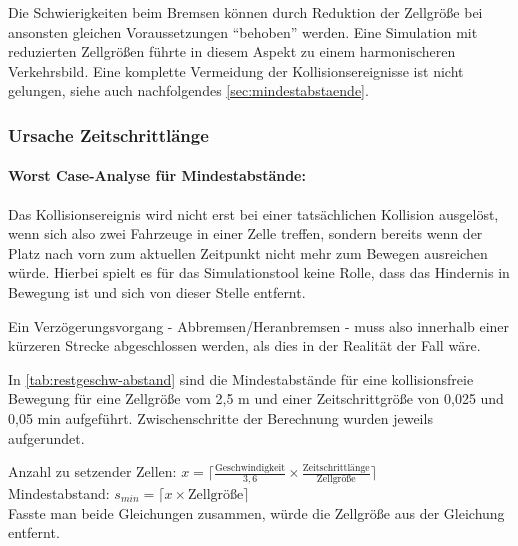 Die Schwierigkeiten beim Bremsen können durch Reduktion der Zellgröße bei ansonsten gleichen Voraussetzungen \enquote{behoben} werden.
Eine Simulation mit reduzierten Zellgrößen führte in diesem Aspekt zu einem harmonischeren Verkehrsbild.
Eine komplette Vermeidung der Kollisionsereignisse ist nicht gelungen, siehe auch nachfolgendes \cref{sec:mindestabstaende}.



\subsubsection{Ursache Zeitschrittlänge}

\paragraph*{Worst Case-Analyse für Mindestabstände:}
\label{sec:mindestabstaende}

Das Kollisionsereignis wird nicht erst bei einer tatsächlichen Kollision ausgelöst, wenn sich also zwei Fahrzeuge in einer Zelle treffen, sondern bereits wenn der Platz nach vorn zum aktuellen Zeitpunkt nicht mehr zum Bewegen ausreichen würde.
Hierbei spielt es für das Simulationstool keine Rolle, dass das Hindernis in Bewegung ist und sich von dieser Stelle entfernt.

Ein Verzögerungsvorgang - Abbremsen/Heranbremsen - muss also innerhalb einer kürzeren Strecke abgeschlossen werden, als dies in der Realität der Fall wäre.

In \cref{tab:restgeschw-abstand} sind die Mindestabstände für eine kollisionsfreie Bewegung für eine Zellgröße vom 2,5 m und einer Zeitschrittgröße von 0,025 und 0,05 min aufgeführt.
Zwischenschritte der Berechnung wurden jeweils aufgerundet.

\noindent
Anzahl zu setzender Zellen: $ x = \lceil \frac{\text{Geschwindigkeit}}{3,6} \times \frac{\text{Zeitschrittlänge}}{\text{Zellgröße}} \rceil $
\\
Mindestabstand: $ s_{min} = \lceil x \times \text{Zellgröße} \rceil $
\\
Fasste man beide Gleichungen zusammen, würde die Zellgröße aus der Gleichung entfernt.

